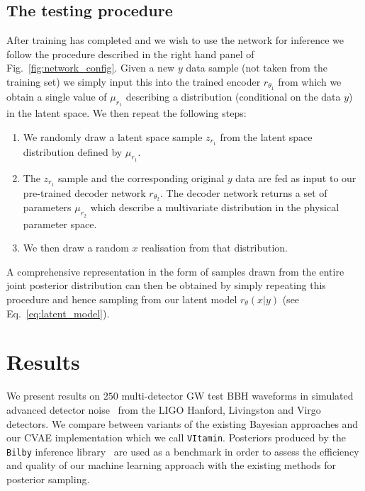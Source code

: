 \subsection{The testing procedure}
%
%
After training has completed and we wish to use the network for inference we
follow the procedure described in the right hand panel of
Fig.~\ref{fig:network_config}. Given a new $y$ data sample (not taken from the
training set) we simply input this into the trained encoder $r_{\theta_1}$ from
which we obtain a single value of $\mu_{r_1}$ describing a distribution
(conditional on the data $y$) in the latent space. We then repeat the following
steps:

%
%
\begin{enumerate}
%
\item We randomly draw a latent space sample $z_{r_1}$ from the latent space
distribution defined by $\mu_{r_1}$.
%
\item The $z_{r_1}$ sample and the corresponding original $y$ data are fed as input to our
pre-trained decoder network $r_{\theta_2}$. The decoder network returns a set
of parameters $\mu_{r_2}$ which describe a multivariate distribution in the physical
parameter space.
%
\item We then draw a random $x$ realisation from that distribution.
%
\end{enumerate}
%

%
%
A comprehensive representation in the form of samples drawn from the entire
joint posterior distribution can then be obtained by simply repeating this
procedure and hence sampling from our latent model $r_{\theta}(x|y)$ (see
Eq.~\ref{eq:latent_model}).


\section{Results}
We present results on $250$ multi-detector \ac{GW} test \ac{BBH}
waveforms in simulated advanced detector noise~\cite{aligo_noisecurves}
from the LIGO Hanford, Livingston and Virgo detectors. We compare between
variants of the existing Bayesian approaches and our \ac{CVAE} implementation
which we call \texttt{VItamin}. Posteriors produced by the \texttt{Bilby}
inference library~\cite{1811.02042} are used as a benchmark in order to assess
the efficiency and quality of our machine learning approach with the existing
methods for posterior sampling.

